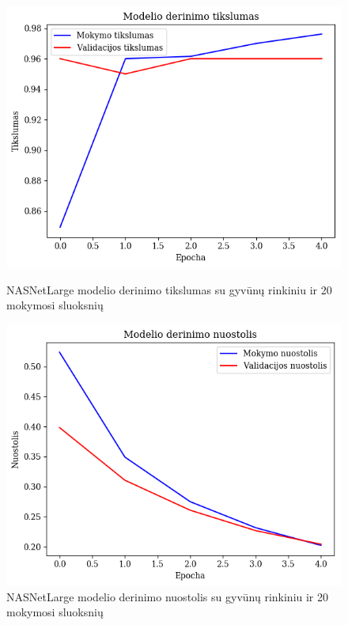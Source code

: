 \documentclass{VUMIFPSbakalaurinis}
\begin{document}
\begin{figure}[!htbp]
    \centering
    \begin{minipage}[b]{0.48\textwidth}
      \includegraphics[width=\textwidth]{img/GrapthsNEW/Large/animal/20/Acc_DC_L_20.png}
      \caption{NASNetLarge modelio derinimo tikslumas su gyvūnų rinkiniu ir 20 mokymosi sluoksnių}
    \end{minipage}
    \hspace{2mm}
    \begin{minipage}[b]{0.48\textwidth}
      \includegraphics[width=\textwidth]{img/GrapthsNEW/Large/animal/20/Loss_DC_L_20.png}
      \caption{NASNetLarge modelio derinimo nuostolis su gyvūnų rinkiniu ir 20 mokymosi sluoksnių}
    \end{minipage}
\end{figure}
\end{document}
